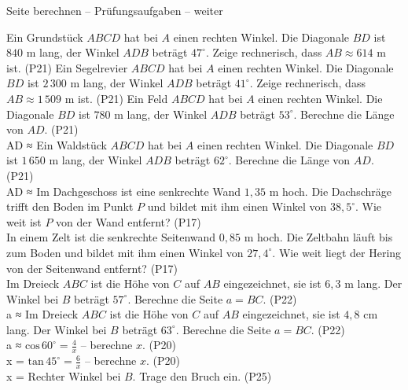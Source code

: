\begin{aufgabe}{Seite berechnen – Prüfungsaufgaben – weiter}
\begin{teile}
\teil Ein Grundstück $ABCD$ hat bei $A$ einen rechten Winkel. Die Diagonale $BD$ ist $840$ m lang, der Winkel $ADB$ beträgt $47^\circ$. Zeige rechnerisch, dass $AB \approx 614$ m ist. \hfill (P21)
\teil Ein Segelrevier $ABCD$ hat bei $A$ einen rechten Winkel. Die Diagonale $BD$ ist $2\,300$ m lang, der Winkel $ADB$ beträgt $41^\circ$. Zeige rechnerisch, dass $AB \approx 1\,509$ m ist. \hfill (P21)
\teil Ein Feld $ABCD$ hat bei $A$ einen rechten Winkel. Die Diagonale $BD$ ist $780$ m lang, der Winkel $ADB$ beträgt $53^\circ$. Berechne die Länge von $AD$. \hfill (P21) \\ AD ≈ \leerfeld[m]
\teil Ein Waldstück $ABCD$ hat bei $A$ einen rechten Winkel. Die Diagonale $BD$ ist $1\,650$ m lang, der Winkel $ADB$ beträgt $62^\circ$. Berechne die Länge von $AD$. \hfill (P21) \\ AD ≈ \leerfeld[m]
\teil Im Dachgeschoss ist eine senkrechte Wand $1{,}35$ m hoch. Die Dachschräge trifft den Boden im Punkt $P$ und bildet mit ihm einen Winkel von $38{,}5^\circ$. Wie weit ist $P$ von der Wand entfernt? \hfill (P17) \\ \leerfeld[m]
\teil In einem Zelt ist die senkrechte Seitenwand $0{,}85$ m hoch. Die Zeltbahn läuft bis zum Boden und bildet mit ihm einen Winkel von $27{,}4^\circ$. Wie weit liegt der Hering von der Seitenwand entfernt? \hfill (P17) \\ \leerfeld[m]
\teil Im Dreieck $ABC$ ist die Höhe von $C$ auf $AB$ eingezeichnet, sie ist $6{,}3$ m lang. Der Winkel bei $B$ beträgt $57^\circ$. Berechne die Seite $a = BC$. \hfill (P22) \\

a ≈ \leerfeld[m]
\teil Im Dreieck $ABC$ ist die Höhe von $C$ auf $AB$ eingezeichnet, sie ist $4{,}8$ cm lang. Der Winkel bei $B$ beträgt $63^\circ$. Berechne die Seite $a = BC$. \hfill (P22) \\

a ≈ \leerfeld[cm]
\teil $\mathrm{cos}\,60^\circ = \frac{4}{x}$ – berechne $x$. \hfill (P20) \\ x = \leerfeld
\teil $\mathrm{tan}\,45^\circ = \frac{6}{x}$ – berechne $x$. \hfill (P20) \\ x = \leerfeld
\teil Rechter Winkel bei $B$. Trage den Bruch ein. \hfill (P25) \\


\end{teile}
\end{aufgabe}
